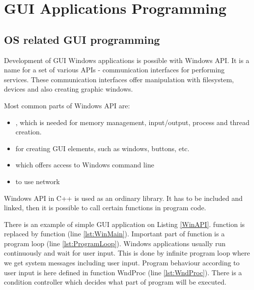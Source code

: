 \chapter{GUI Applications Programming}
\vspace{-10mm}


\section{OS related GUI programming}


Development of GUI Windows applications is possible with Windows API. It is a name for a set of various APIs - communication interfaces for performing services. These communication interfaces offer manipulation with filesystem, devices and also creating graphic windows.

Most common parts of Windows API are:
\begin{itemize}
\item {}, which is needed for memory management, input/output, process and thread creation.
\item {} for creating GUI elements, such as windows, buttons, etc.
\item {} which offers access to Windows command line
\item {} to use network
\end{itemize}

Windows API in C++ is used as an ordinary library. It has to be included and linked, then it is possible to call certain functions in program code.

There is an example of simple GUI application on Listing \ref{WinAPI}.  function is replaced by  function (line \ref{lst:WinMain}). Important part of  function is a program loop (line \ref{lst:ProgramLoop}). Windows applications usually run continuously and wait for user input. This is done by infinite program loop where we get system messages including user input. Program behaviour according to user input is here defined in function WndProc (line \ref{lst:WndProc}). There is a condition controller which decides what part of program will be executed.

